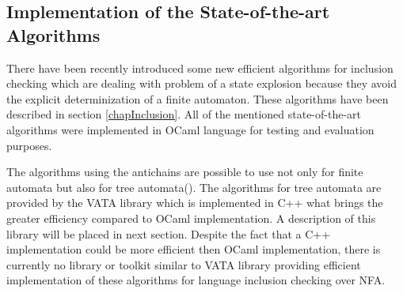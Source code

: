 \subsection{Implementation of the State-of-the-art Algorithms}
There have been recently introduced some new efficient algorithms for inclusion checking 
which are dealing with problem of a state explosion because they avoid the explicit determinization of a finite automaton. These 
algorithms have been described in section \ref{chapInclusion}.
All of the mentioned state-of-the-art algorithms were implemented in OCaml language for testing and evaluation purposes.

The algorithms using the antichains are possible to use not only for finite automata but also for tree automata(\cite{cav06,tacas10}). 
The algorithms for tree automata are provided by the VATA library which is implemented in C++ what brings the greater efficiency compared to OCaml implementation. 
A description of this library will be placed in next section.
Despite the fact that a C++ implementation could be more efficient then OCaml  implementation, there is currently 
no library or toolkit similar to VATA library providing efficient implementation of these algorithms for language inclusion checking over NFA.

